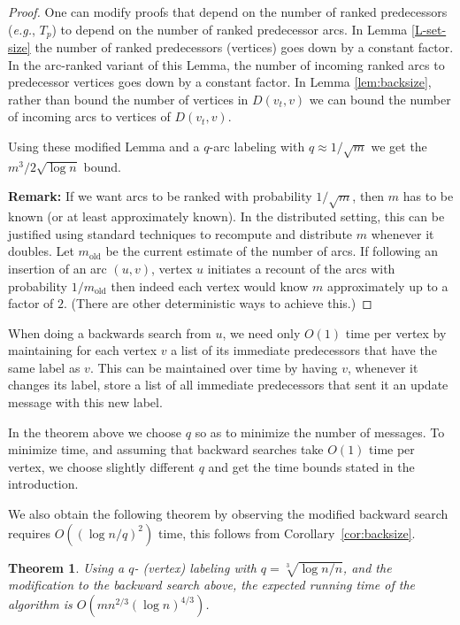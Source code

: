 \documentclass[11pt]{article}
\theoremstyle{plain}
\newtheorem{thm}{Theorem}[section]
\theoremstyle{definition}
\theoremstyle{remark}
\numberwithin{equation}{section}
\begin{document}
\begin{proof}
One can modify proofs that depend on the number of ranked
predecessors ({\sl e.g.}, $T_p$) to depend on the number of ranked
predecessor arcs. In Lemma \ref{L-set-size} the number of ranked
predecessors (vertices) goes down by a constant factor. In the
arc-ranked variant of this Lemma, the number of incoming ranked arcs
to predecessor vertices goes
 down by a constant factor. In Lemma \ref{lem:backsize}, rather
 than bound the number of vertices in $D(v_t,v)$ we can bound the
 number of incoming arcs to vertices of $D(v_t,v)$.

 Using these modified Lemma and a $q$-arc labeling with $q\approx
 1/\sqrt{m}$ we get the $m^3/2\sqrt{\log n}$ bound.

{\bf Remark:} If we want arcs to be ranked with probability
$1/\sqrt{m}$, then $m$ has to be known (or at least approximately
known).
 In the distributed setting, this can  be justified using
standard techniques to recompute and distribute $m$ whenever it
doubles. Let $m_{\mathrm{old}}$ be the current estimate of the
number of arcs. If following an insertion of an arc $(u,v)$, vertex
$u$ initiates a recount of the arcs with probability
$1/m_{\mathrm{old}}$ then indeed each vertex would know $m$
approximately up to a factor of $2$. (There are other deterministic
ways to achieve this.)
\end{proof}

When doing a backwards search from $u$, we need only $O(1)$ time per
vertex by  maintaining for each vertex $v$ a list of its immediate
predecessors that have the same label as $v$. This can be maintained
over time by having $v$, whenever it changes its label, store a list
of all immediate predecessors that sent it an update message with
this new label.

In the theorem above we choose $q$ so as to minimize the number of
messages. To minimize time, and assuming that backward searches take
$O(1)$ time per vertex, we choose slightly different $q$ and get the
time bounds stated in the introduction.

We also obtain the following theorem by observing the modified
backward search requires $O((\log n / q)^2)$ time, this follows from
 Corollary~\ref{cor:backsize}.

\begin{thm} \label{thm:33}
Using a $q$- (vertex) labeling with $q= \sqrt[3]{\log n /n}$, and
the modification to the backward search above, the expected running
time of the algorithm is $O(mn^{2/3}(\log n)^{4/3})$.
\end{thm}
\end{document}
